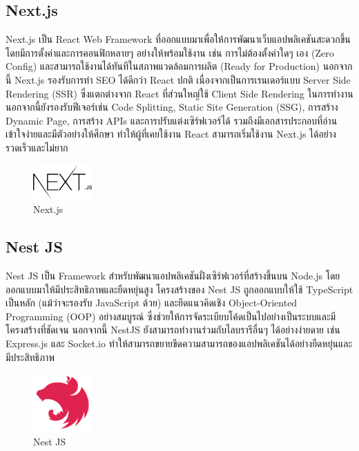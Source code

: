 \newpage

\subsection{Next.js}
Next.js เป็น React Web Framework ที่ออกแบบมาเพื่อให้การพัฒนาเว็บแอปพลิเคชันสะดวกขึ้น โดยมีการตั้งค่าและการคอนฟิกหลายๆ อย่างให้พร้อมใช้งาน เช่น การไม่ต้องตั้งค่าใดๆ เอง (Zero Config) และสามารถใช้งานได้ทันทีในสภาพแวดล้อมการผลิต (Ready for Production) นอกจากนี้ Next.js รองรับการทำ SEO ได้ดีกว่า React ปกติ เนื่องจากเป็นการเรนเดอร์แบบ Server Side Rendering (SSR) ซึ่งแตกต่างจาก React ที่ส่วนใหญ่ใช้ Client Side Rendering ในการทำงาน นอกจากนี้ยังรองรับฟีเจอร์เช่น Code Splitting, Static Site Generation (SSG), การสร้าง Dynamic Page, การสร้าง APIs และการปรับแต่งเซิร์ฟเวอร์ได้ รวมถึงมีเอกสารประกอบที่อ่านเข้าใจง่ายและมีตัวอย่างให้ศึกษา ทำให้ผู้ที่เคยใช้งาน React สามารถเริ่มใช้งาน Next.js ได้อย่างรวดเร็วและไม่ยาก \cite{aiw3}
\begin{figure}[H]
  \begin{center}
  \includegraphics[width=0.2\textwidth]{next-js-seeklogo.png}
  \end{center}
  \caption[Next.js]{Next.js}
\end{figure}
\subsection{Nest JS}
Nest JS เป็น Framework สำหรับพัฒนาแอปพลิเคชันฝั่งเซิร์ฟเวอร์ที่สร้างขึ้นบน Node.js โดยออกแบบมาให้มีประสิทธิภาพและยืดหยุ่นสูง โครงสร้างของ Nest JS ถูกออกแบบให้ใช้ TypeScript เป็นหลัก (แม้ว่าจะรองรับ JavaScript ด้วย) และยึดแนวคิดเชิง Object-Oriented Programming (OOP) อย่างสมบูรณ์ ซึ่งช่วยให้การจัดระเบียบโค้ดเป็นไปอย่างเป็นระบบและมีโครงสร้างที่ชัดเจน นอกจากนี้ NestJS ยังสามารถทำงานร่วมกับไลบรารีอื่นๆ ได้อย่างง่ายดาย เช่น Express.js และ Socket.io ทำให้สามารถขยายขีดความสามารถของแอปพลิเคชันได้อย่างยืดหยุ่นและมีประสิทธิภาพ \cite{aiw4}
\begin{figure}[H]
  \begin{center}
  \includegraphics[width=0.2\textwidth]{nest-js-icon.png}
  \end{center}
  \caption[Nest JS]{Nest JS}
\end{figure}


